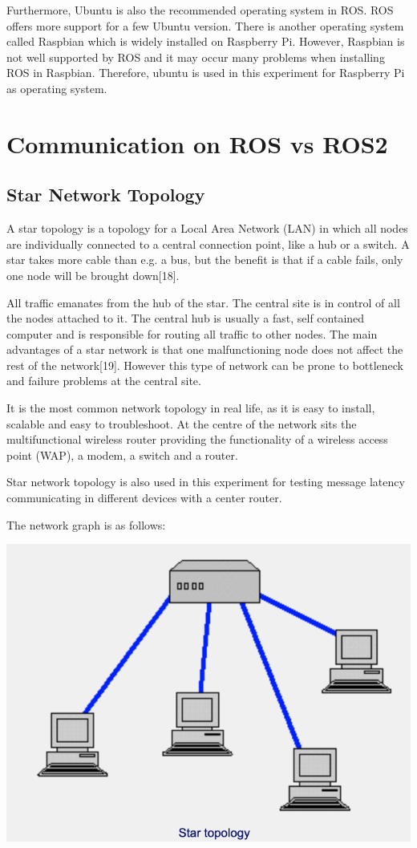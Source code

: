 \documentclass{mproj}
\begin{document}
Furthermore, Ubuntu is also the recommended operating system in ROS. ROS offers more support for a few Ubuntu version. There is another operating system called Raspbian which is widely installed on Raspberry Pi. However, Raspbian is not well supported by ROS and it may occur many problems when installing ROS in Raspbian. Therefore, ubuntu is used in this experiment for Raspberry Pi as operating system.

\section{Communication on ROS vs ROS2}

\subsection{Star Network Topology}
A star topology is a topology for a Local Area Network (LAN) in which all nodes are individually connected to a central connection point, like a hub or a switch. A star takes more cable than e.g. a bus, but the benefit is that if a cable fails, only one node will be brought down[18].

All traffic emanates from the hub of the star. The central site is in control of all the nodes attached to it. The central hub is usually a fast, self contained computer and is responsible for routing all traffic to other nodes. The main advantages of a star network is that one malfunctioning node does not affect the rest of the network[19]. However this type of network can be prone to bottleneck and failure problems at the central site.

It is the most common network topology in real life, as it is easy to install, scalable and easy to troubleshoot. At the centre of the network sits the multifunctional wireless router providing the functionality of a wireless access point (WAP), a modem, a switch and a router.

Star network topology is also used in this experiment for testing message latency communicating in different devices with a center router.

The network graph is as follows:

\includegraphics[width = .7\textwidth]{231.png}
\end{document}
